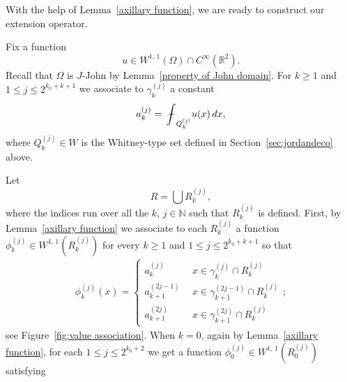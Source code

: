 \documentclass[reqno,11pt]{amsart}
\def\bint{{\ifinner\rlap{\bf\kern.35em--}
\int\else\rlap{\bf\kern.45em--}\int\fi}\ignorespaces}
\numberwithin{equation}{section}
\theoremstyle{remark}
\def\bint{{\ifinner\rlap{\bf\kern.35em--}
\int\else\rlap{\bf\kern.45em--}\int\fi}\ignorespaces}
\begin{document}
With the help of Lemma~\ref{axillary function}, we are ready to construct our 
extension operator. 




Fix a function 
\begin{equation}\label{assumption u}
u\in W^{1,\,1}(\Omega)\cap C^{\infty}(\mathbb R^2).
\end{equation}
Recall that $\Omega$ is $J$-John by Lemma~\ref{property of John domain}. For $k\ge 1$ and $1\le j\le 2^{k_0+k+1}$ we associate to $\gamma_k^{(j)}$  a constant
$$a_k^{(j)}=\bint_{Q_k^{(j)}} u(x) \,dx, $$
where $Q_k^{(j)}\in W$ is the Whitney-type set defined in Section~\ref{sec:jordandeco} above. 


Let 
$$R=\bigcup R_k^{(j)},$$
where the indices run over all the $k,\,j\in \mathbb N$ such that $ R_k^{(j)} $ is defined. 
First, by Lemma~\ref{axillary function} we associate to each $R_{k}^{(j)}$ 
a function $\phi_{k}^{(j)}\in W^{1,\,1}(R_{k}^{(j)})$ for every $k\ge 1$ and $1\le j\le 2^{k_0+k+1}$ so that 
\begin{align*}
\phi_{k}^{(j)}(x) = \left\{ \begin{array}{ll}
a_k^{(j)} \ & \ x\in \gamma_k^{(j)}\cap R_{k}^{(j)}\\
a_{k+1}^{(2j-1)} \ & \ x\in \gamma_{k+1}^{(2j-1)}\cap R_{k}^{(j)}\\
a_{k+1}^{(2j)} \ & \ x\in \gamma_{k+1}^{(2j)}\cap R_{k}^{(j)}
\end{array} \right. ;
\end{align*}
see Figure~\ref{fig:value association}. 
When $k=0$, again by Lemma~\ref{axillary function}, for each $1\le j\le    2^{k_0+2}$ we get a function $\phi_{0}^{(j)}\in W^{1,\,1}(R_{0}^{(j)})$ satisfying
\end{document}
